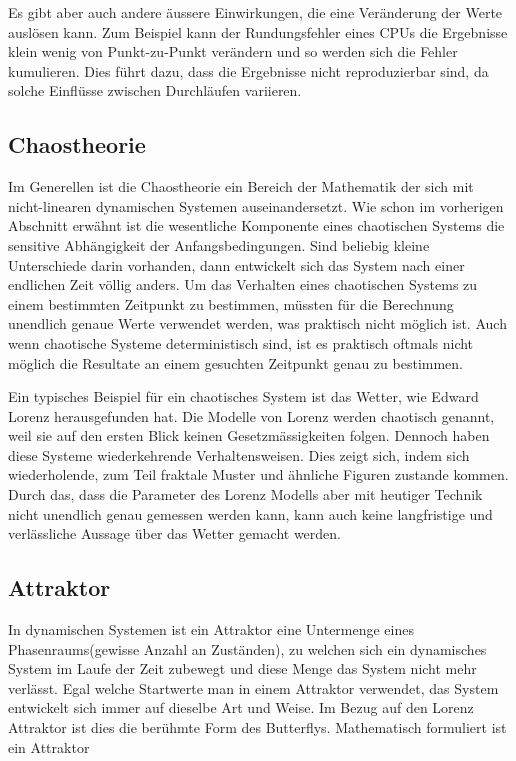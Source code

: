 Es gibt aber auch andere äussere Einwirkungen, die eine Veränderung der Werte auslösen kann. Zum Beispiel kann der Rundungsfehler eines CPUs die Ergebnisse klein wenig von Punkt-zu-Punkt verändern und so werden sich die Fehler kumulieren. Dies führt dazu, dass die Ergebnisse nicht reproduzierbar sind, da solche Einflüsse zwischen Durchläufen variieren.

\subsection{Chaostheorie}
Im Generellen ist die Chaostheorie ein Bereich der Mathematik der sich mit nicht-linearen dynamischen Systemen auseinandersetzt. Wie schon im vorherigen Abschnitt erwähnt ist die wesentliche Komponente eines chaotischen Systems die sensitive Abhängigkeit der Anfangsbedingungen. Sind beliebig kleine Unterschiede darin vorhanden, dann entwickelt sich das System nach einer endlichen Zeit völlig anders. Um das Verhalten eines chaotischen Systems zu einem bestimmten Zeitpunkt zu bestimmen, müssten für die Berechnung unendlich genaue Werte verwendet werden, was praktisch nicht möglich ist. Auch wenn chaotische Systeme deterministisch sind, ist es praktisch oftmals nicht möglich die Resultate an einem gesuchten Zeitpunkt genau zu bestimmen. 


Ein typisches Beispiel für ein chaotisches System ist das Wetter, wie Edward Lorenz herausgefunden hat. Die Modelle von Lorenz werden chaotisch genannt, weil sie auf den ersten Blick keinen Gesetzmässigkeiten folgen. Dennoch haben diese Systeme wiederkehrende Verhaltensweisen. Dies zeigt sich, indem sich wiederholende, zum Teil fraktale Muster und ähnliche Figuren zustande kommen. Durch das, dass die Parameter des Lorenz Modells aber mit heutiger Technik nicht unendlich genau gemessen werden kann, kann auch keine langfristige und verlässliche Aussage über das Wetter gemacht werden. 

\subsection{Attraktor}
In dynamischen Systemen ist ein Attraktor eine Untermenge eines Phasenraums(gewisse Anzahl an Zuständen), zu welchen sich ein dynamisches System im Laufe der Zeit zubewegt und diese Menge das System nicht mehr verlässt. \cite{wikiattraktor}
 Egal welche Startwerte man in einem Attraktor verwendet, das System entwickelt sich immer auf dieselbe Art und Weise. Im Bezug auf den Lorenz Attraktor ist dies die berühmte Form des Butterflys. Mathematisch formuliert ist ein Attraktor 


